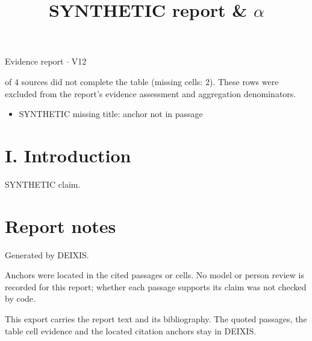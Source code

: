 \documentclass[journal]{IEEEtran}
\begin{document}
\title{SYNTHETIC report \& \ensuremath{\alpha}}

\maketitle

\noindent Evidence report \ensuremath{\cdot} V12

 of 4 sources did not complete the table (missing cells: 2). These rows were excluded from the report's evidence assessment and aggregation denominators.

\begin{itemize}
\item SYNTHETIC missing title: anchor not in passage
\end{itemize}

\section*{I. Introduction}

SYNTHETIC claim. \cite{Synth26}

\section*{Report notes}

Generated by DEIXIS.

Anchors were located in the cited passages or cells. No model or person review is recorded for this report; whether each passage supports its claim was not checked by code.

This export carries the report text and its bibliography. The quoted passages, the table cell evidence and the located citation anchors stay in DEIXIS.




\end{document}
